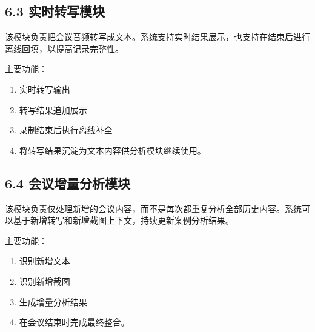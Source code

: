 \documentclass[12pt,a4paper]{article}
\begin{document}
\subsection*{6.3 实时转写模块}
\vspace{0.45em}
该模块负责把会议音频转写成文本。系统支持实时结果展示，也支持在结束后进行离线回填，以提高记录完整性。\par
\vspace{0.45em}
主要功能：\par
\vspace{0.45em}
\begin{enumerate}
\item 实时转写输出
\item 转写结果追加展示
\item 录制结束后执行离线补全
\item 将转写结果沉淀为文本内容供分析模块继续使用。
\end{enumerate}
\vspace{0.45em}
\subsection*{6.4 会议增量分析模块}
\vspace{0.45em}
该模块负责仅处理新增的会议内容，而不是每次都重复分析全部历史内容。系统可以基于新增转写和新增截图上下文，持续更新案例分析结果。\par
\vspace{0.45em}
\newpage
{}
\fancyhead[R]{}
主要功能：\par
\vspace{0.45em}
\begin{enumerate}
\item 识别新增文本
\item 识别新增截图
\item 生成增量分析结果
\item 在会议结束时完成最终整合。
\end{enumerate}
\vspace{0.45em}
\end{document}
